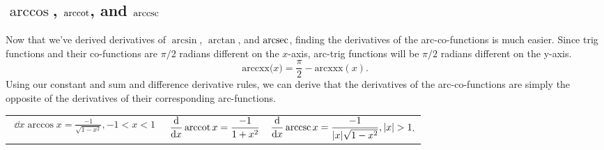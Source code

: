 \subsection{$\arccos$, $\operatorname{arccot}$, and $\operatorname{arccsc}$}
Now that we've derived derivatives of $\arcsin$, $\arctan$, and $\operatorname{arcsec}$, finding the derivatives of the arc-co-functions is much easier.
Since trig functions and their co-functions are $\pi/2$ radians different on the $x$-axis, arc-trig functions will be $\pi/2$ radians different on the y-axis.
\begin{equation*}
	\text{arccxx{($x$)}} = \frac{\pi}{2} - \text{arcxxx}{(x)}.
\end{equation*}
Using our constant and sum and difference derivative rules, we can derive that the derivatives of the arc-co-functions are simply the opposite of the derivatives of their corresponding arc-functions.
\begin{table}[H]
	\begin{center}
		\begin{tabular}{ l l l }
			$\begin{aligned}\dd{}{x}\arccos{x}=\frac{-1}{\sqrt{1-x^2}},-1<x<1\end{aligned}$ & $\begin{aligned}\frac{\mathrm{d} }{\mathrm{d} x}\operatorname{arccot}{x}=\frac{-1}{1+x^2}\end{aligned}$ & $\begin{aligned}\frac{\mathrm{d} }{\mathrm{d} x}\operatorname{arccsc}{x}=\frac{-1}{\lvert x \rvert\sqrt{1-x^2}},\lvert x \rvert>1\end{aligned}.$ \\
		\end{tabular}
	\end{center}
\end{table}